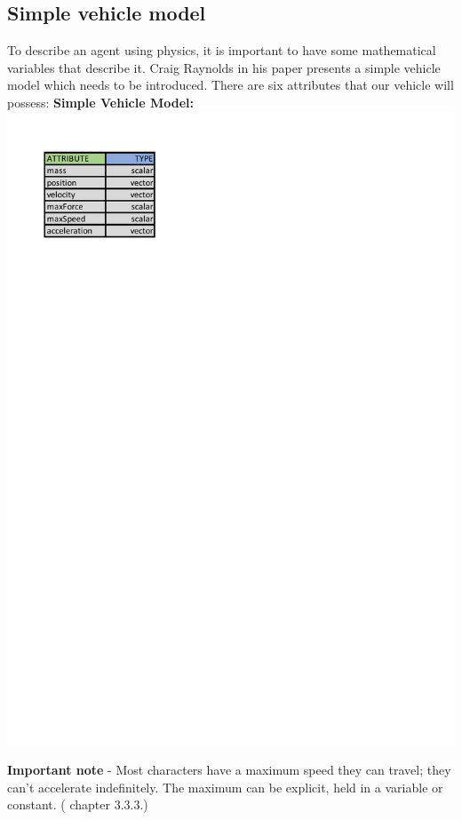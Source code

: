 \documentclass[10pt,twoside,english,a4paper]{article}
\begin{document}
\subsection{Simple vehicle model} \label{model}
To describe an agent using physics, it is important to have some
mathematical variables that describe it. Craig Raynolds in his 
paper \cite{Raynolds} presents a simple 
vehicle model which needs to be introduced. There are six 
attributes that our vehicle will possess:
\newline 
\newline
\textbf{Simple Vehicle Model:} \\
\includegraphics[scale=0.6]{attributes.pdf}

\textbf{Important note} - Most characters have a maximum speed they can travel; 
they can’t accelerate indefinitely. The maximum can be
explicit, held in a variable or constant. (\cite{Millington} chapter 3.3.3.)
\end{document}
